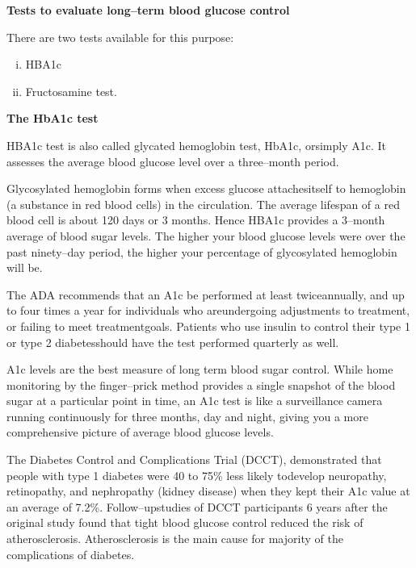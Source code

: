 \noindent\textbf{Tests to evaluate long–term blood glucose control}

\noindent There are two tests available for this purpose:

\vspace{-\topsep}
\begin{enumerate}[i.]
\itemsep=0pt
\item HBA1c
\item Fructosamine test.
\end{enumerate}
\vspace{-\topsep}

\noindent\textbf{The HbA1c test}

HBA1c test is also called glycated hemoglobin test, HbA1c, or\break simply A1c. It assesses the average blood glucose level over a three–month period.

Glycosylated hemoglobin forms when excess glucose attaches\break itself to hemoglobin (a substance in red blood cells) in the circulation. The average life\-span of a red blood cell is about 120 days or 3 months. Hence HBA1c provides a 3–month average of blood sugar levels. The higher your blood glucose levels were over the past ninety–day period, the higher your percentage of glycosylated hemoglobin will be.

The ADA recommends that an A1c be performed at least twice\break annually, and up to four times a year for individuals who are\break undergoing adjustments to treatment, or failing to meet treatment\break goals. Patients who use insulin to control their type 1 or type 2 diabetes\break should have the test performed quarterly as well.

A1c levels are the best measure of long term blood sugar control. While home monitoring by the finger–prick method provides a single snapshot of the blood sugar at a particular point in time, an A1c test is like a surveillance camera running continuously for three months, day and night, giving you a more comprehensive picture of average blood glucose levels.

The Diabetes Control and Complications Trial (DCCT), demonstra\-ted that people with type 1 diabetes were 40 to 75\% less likely to\break develop neuropathy, retinopathy, and nephropathy (kidney di\-sease) when they kept their A1c value at an average of 7.2\%. Follow–up\break studies of DCCT participants 6 years after the original study found that tight blood glucose control reduced the risk of atherosclerosis. Athero\-sclerosis is the main cause for majority of the complications of diabetes.

